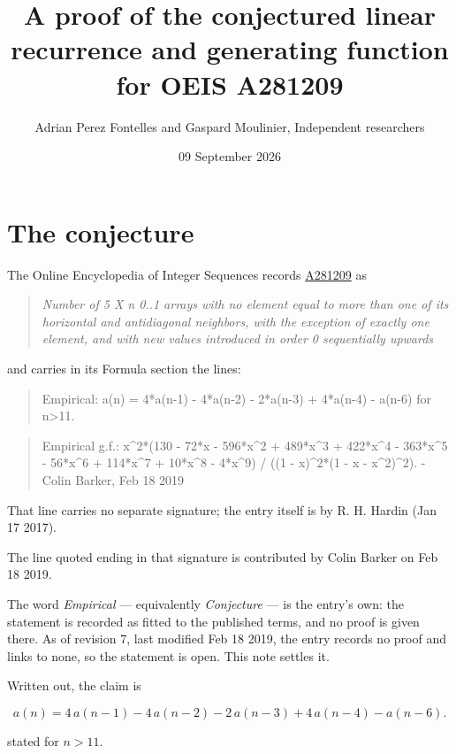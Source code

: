 \documentclass[11pt]{article}
\title{A proof of the conjectured linear recurrence and generating function for OEIS A281209}
\author{Adrian Perez Fontelles and Gaspard Moulinier, Independent researchers}
\date{09 September 2026}
\theoremstyle{definition}
\begin{document}
\maketitle
\section{The conjecture}

The Online Encyclopedia of Integer Sequences records \href{https://oeis.org/A281209}{A281209} as

\begin{quote}\itshape Number of 5 X n 0..1 arrays with no element equal to more than one of its horizontal and antidiagonal neighbors, with the exception of exactly one element, and with new values introduced in order 0 sequentially upwards\end{quote}

and carries in its Formula section the lines:

\begin{quote}\ttfamily Empirical: a(n) = 4*a(n-1) - 4*a(n-2) - 2*a(n-3) + 4*a(n-4) - a(n-6) for n>11.\end{quote}

\begin{quote}\ttfamily Empirical g.f.: x\textasciicircum{}2*(130 - 72*x - 596*x\textasciicircum{}2 + 489*x\textasciicircum{}3 + 422*x\textasciicircum{}4 - 363*x\textasciicircum{}5 - 56*x\textasciicircum{}6 + 114*x\textasciicircum{}7 + 10*x\textasciicircum{}8 - 4*x\textasciicircum{}9) / ((1 - x)\textasciicircum{}2*(1 - x - x\textasciicircum{}2)\textasciicircum{}2). - Colin Barker, Feb 18 2019\end{quote}

That line carries no separate signature; the entry itself is by R. H. Hardin (Jan 17 2017).

The line quoted ending in that signature is contributed by Colin Barker on Feb 18 2019.

The word {\itshape Empirical} --- equivalently {\itshape Conjecture} --- is the entry's own: the statement is recorded as fitted to the published terms, and no proof is given there. As of revision 7, last modified Feb 18 2019, the entry records no proof and links to none, so the statement is open. This note settles it.

Written out, the claim is

\[a(n) = 4\,a(n-1) - 4\,a(n-2) - 2\,a(n-3) + 4\,a(n-4) - a(n-6).\]

stated for $n > 11$.
\end{document}

